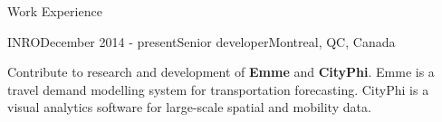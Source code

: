 \documentclass{resume} %
\begin{document}
\begin{rSection}{Work Experience}

\begin{rSubsection}{INRO}{December 2014 - present}{Senior developer}{Montreal,
        QC, Canada}
\item Contribute to research and development of \textbf{Emme} and
        \textbf{CityPhi}. Emme is a travel demand modelling system for
        transportation forecasting. CityPhi is a visual analytics software for
        large-scale spatial and mobility data.
        


\end{rSubsection}
\end{rSection}
\end{document}
